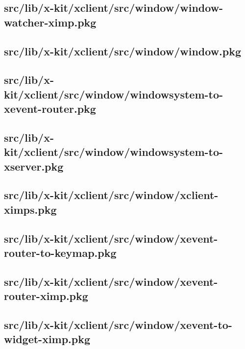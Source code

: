 \subsection{src/lib/x-kit/xclient/src/window/window-watcher-ximp.pkg}


\subsection{src/lib/x-kit/xclient/src/window/window.pkg}


\subsection{src/lib/x-kit/xclient/src/window/windowsystem-to-xevent-router.pkg}


\subsection{src/lib/x-kit/xclient/src/window/windowsystem-to-xserver.pkg}


\subsection{src/lib/x-kit/xclient/src/window/xclient-ximps.pkg}


\subsection{src/lib/x-kit/xclient/src/window/xevent-router-to-keymap.pkg}


\subsection{src/lib/x-kit/xclient/src/window/xevent-router-ximp.pkg}


\subsection{src/lib/x-kit/xclient/src/window/xevent-to-widget-ximp.pkg}


